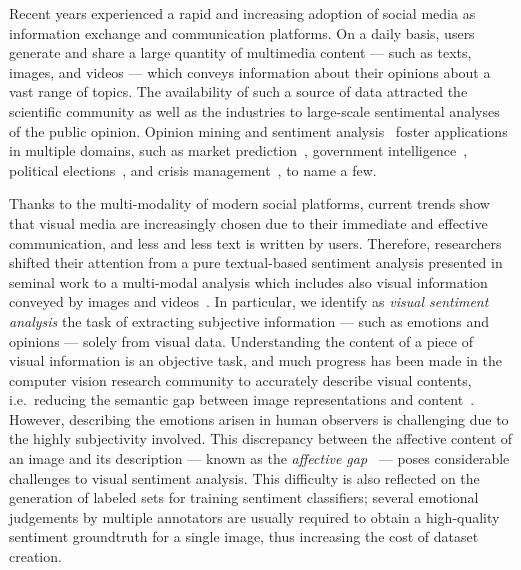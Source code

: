 Recent years experienced a rapid and increasing adoption of social media as information exchange and communication platforms.
On a daily basis, users generate and share a large quantity of multimedia content --- such as texts, images, and videos --- which conveys information about their opinions about a vast range of topics.
The availability of such a source of data attracted the scientific community as well as the industries to large-scale sentimental analyses of the public opinion.
Opinion mining and sentiment analysis~\cite{pang2008opinion} foster applications in multiple domains, such as market prediction~\cite{mishne2006predicting,asur2010predicting}, government intelligence~\cite{abbasi2007affect}, political elections~\cite{laver2003extracting,o2010tweets}, and crisis management~\cite{avvenuti2016impromptu,cresci2015linguistically}, to name a few.

Thanks to the multi-modality of modern social platforms, current trends show that visual media are increasingly chosen due to their immediate and effective communication, and less and less text is written by users.
Therefore, researchers shifted their attention from a pure textual-based sentiment analysis presented in seminal work to a multi-modal analysis which includes also visual information conveyed by images and videos~\cite{borth2013large,cao2016cross,jou2015visual,siersdorfer2010analyzing,you2015robust,you2016cross}.
In particular, we identify as \emph{visual sentiment analysis} the task of extracting subjective information --- such as emotions and opinions --- solely from visual data.
Understanding the content of a piece of visual information is an objective task, and much progress has been made in the computer vision research community to accurately describe visual contents, i.e.\ reducing the semantic gap between image representations and content~\cite{li2016socializing}.
However, describing the emotions arisen in human observers is challenging due to the highly subjectivity involved.
This discrepancy between the affective content of an image and its description --- known as the \emph{affective gap}~\cite{siersdorfer2010analyzing} --- poses considerable challenges to visual sentiment analysis.
This difficulty is also reflected on the generation of labeled sets for training sentiment classifiers;
several emotional judgements by multiple annotators are usually required to obtain a high-quality sentiment groundtruth for a single image, thus increasing the cost of dataset creation.


